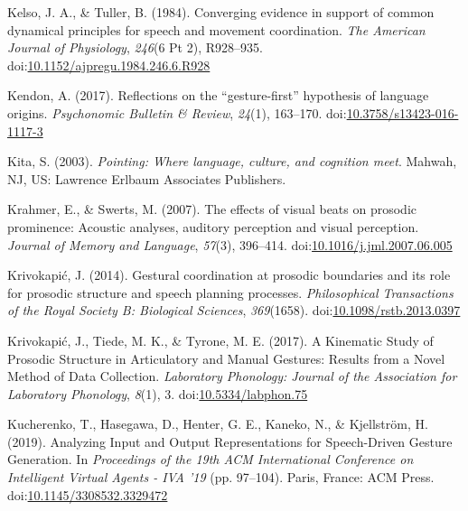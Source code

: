 \documentclass[
  man,floatsintext]{apa6}
\newlength{\cslhangindent}
\newenvironment{cslreferences}%
  {\setlength{\parindent}{0pt}%
  \everypar{\setlength{\hangindent}{\cslhangindent}}\ignorespaces}%
  {\par}
\begin{document}
\begin{cslreferences}
\leavevmode\hypertarget{ref-kelsoConvergingEvidenceSupport1984}{}%
Kelso, J. A., \& Tuller, B. (1984). Converging evidence in support of common dynamical principles for speech and movement coordination. \emph{The American Journal of Physiology}, \emph{246}(6 Pt 2), R928--935. doi:\href{https://doi.org/10.1152/ajpregu.1984.246.6.R928}{10.1152/ajpregu.1984.246.6.R928}

\leavevmode\hypertarget{ref-kendonReflectionsGesturefirstHypothesis2017}{}%
Kendon, A. (2017). Reflections on the ``gesture-first'' hypothesis of language origins. \emph{Psychonomic Bulletin \& Review}, \emph{24}(1), 163--170. doi:\href{https://doi.org/10.3758/s13423-016-1117-3}{10.3758/s13423-016-1117-3}

\leavevmode\hypertarget{ref-kitaPointingWhereLanguage2003}{}%
Kita, S. (2003). \emph{Pointing: Where language, culture, and cognition meet}. Mahwah, NJ, US: Lawrence Erlbaum Associates Publishers.

\leavevmode\hypertarget{ref-krahmerEffectsVisualBeats2007}{}%
Krahmer, E., \& Swerts, M. (2007). The effects of visual beats on prosodic prominence: Acoustic analyses, auditory perception and visual perception. \emph{Journal of Memory and Language}, \emph{57}(3), 396--414. doi:\href{https://doi.org/10.1016/j.jml.2007.06.005}{10.1016/j.jml.2007.06.005}

\leavevmode\hypertarget{ref-krivokapicGesturalCoordinationProsodic2014}{}%
Krivokapić, J. (2014). Gestural coordination at prosodic boundaries and its role for prosodic structure and speech planning processes. \emph{Philosophical Transactions of the Royal Society B: Biological Sciences}, \emph{369}(1658). doi:\href{https://doi.org/10.1098/rstb.2013.0397}{10.1098/rstb.2013.0397}

\leavevmode\hypertarget{ref-krivokapicKinematicStudyProsodic2017}{}%
Krivokapić, J., Tiede, M. K., \& Tyrone, M. E. (2017). A Kinematic Study of Prosodic Structure in Articulatory and Manual Gestures: Results from a Novel Method of Data Collection. \emph{Laboratory Phonology: Journal of the Association for Laboratory Phonology}, \emph{8}(1), 3. doi:\href{https://doi.org/10.5334/labphon.75}{10.5334/labphon.75}

\leavevmode\hypertarget{ref-kucherenkoAnalyzingInputOutput2019}{}%
Kucherenko, T., Hasegawa, D., Henter, G. E., Kaneko, N., \& Kjellström, H. (2019). Analyzing Input and Output Representations for Speech-Driven Gesture Generation. In \emph{Proceedings of the 19th ACM International Conference on Intelligent Virtual Agents - IVA '19} (pp. 97--104). Paris, France: ACM Press. doi:\href{https://doi.org/10.1145/3308532.3329472}{10.1145/3308532.3329472}


\end{cslreferences}
\end{document}
